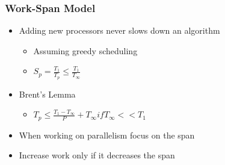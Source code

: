 \documentclass{beamer}
\begin{document}
\begin{frame}[fragile]
	\frametitle{Work-Span Model}
\begin{itemize}
\item Adding new processors never slows down an algorithm
	\begin{itemize}
	\item Assuming greedy scheduling
	\item $S_{p} =\frac{T_{1}}{T_{p}} \leq \frac{T_{1}}{T_{\infty}}$
	\end{itemize}
\item Brent’s Lemma
	\begin{itemize}
	\item $T_{p}\leq\frac{T_{1}-T_{\infty}}{P} + T_{\infty} if T_{\infty} << T_{1}$
	\end{itemize}
\item When working on parallelism focus on the span
\item Increase work only if it decreases the span 
\end{itemize}
\end{frame}
\end{document}
